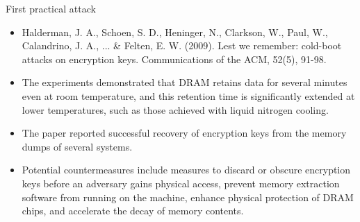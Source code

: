 \begin{frame}{First practical attack}
    \begin{itemize}
        \item Halderman, J. A., Schoen, S. D., Heninger, N., Clarkson, W., Paul, W., Calandrino, J. A., ... \& Felten, E. W. (2009). Lest we remember: cold-boot attacks on encryption keys. Communications of the ACM, 52(5), 91-98.
        \item The experiments demonstrated that DRAM retains data for several minutes even at room temperature, and this retention time is significantly extended at lower temperatures, such as those achieved with liquid nitrogen cooling.
        \item The paper reported successful recovery of encryption keys from the memory dumps of several systems.
        \item Potential countermeasures include measures to discard or obscure encryption keys before an adversary gains physical access, prevent memory extraction software from running on the machine, enhance physical protection of DRAM chips, and accelerate the decay of memory contents.
    \end{itemize}
\end{frame}